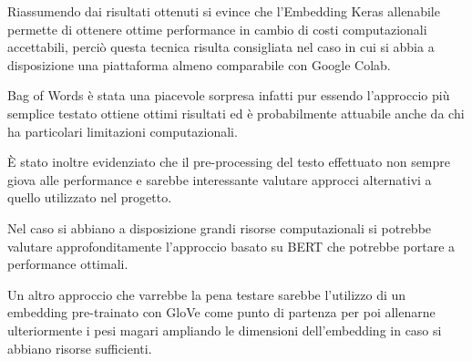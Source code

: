 
Riassumendo dai risultati ottenuti si evince che l'Embedding Keras allenabile
permette di ottenere ottime performance in cambio di costi computazionali
accettabili, perciò questa tecnica risulta consigliata nel caso in cui si abbia a
disposizione una piattaforma almeno comparabile con Google Colab.

Bag of Words è stata una piacevole sorpresa infatti pur essendo l'approccio più
semplice testato ottiene ottimi risultati ed è probabilmente attuabile anche
da chi ha particolari limitazioni computazionali.

È stato inoltre evidenziato che il pre-processing del testo effettuato non sempre giova
alle performance e sarebbe interessante valutare approcci alternativi a quello
utilizzato nel progetto.

Nel caso si abbiano a disposizione grandi risorse computazionali si potrebbe
valutare approfonditamente l'approccio basato su BERT che potrebbe portare a
performance ottimali.

Un altro approccio che varrebbe la pena testare sarebbe l'utilizzo di un embedding
pre-trainato con GloVe come punto di partenza per poi allenarne ulteriormente i
pesi magari ampliando le dimensioni dell'embedding in caso si abbiano risorse sufficienti.
